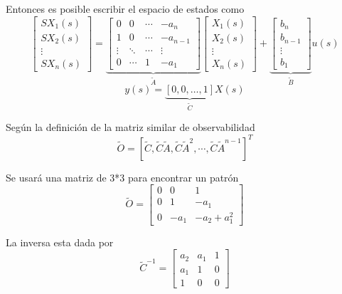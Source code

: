 Entonces es posible escribir el espacio de estados como
\[
    \begin{bmatrix}
        SX_{1}(s) \\
        SX_{2}(s) \\
        \vdots \\
        SX_{n}(s)
    \end{bmatrix}
    =
    \underbrace{
        \begin{bmatrix}
        0 & 0 & \cdots & -a_{n} \\
        1 & 0 & \cdots & -a_{n-1} \\
        \vdots & \ddots & \cdots & \vdots \\
        0 & \cdots & 1 & -a_{1}
        \end{bmatrix}
                }_{\tilde{A}}
    \begin{bmatrix}
        X_{1}(s) \\
        X_{2}(s) \\
        \vdots \\
        X_{n}(s)
    \end{bmatrix}
    +
    \underbrace{
        \begin{bmatrix}
        b_{n} \\
        b_{n-1} \\
        \vdots \\
        b_{1}
        \end{bmatrix}
                }_{\tilde{B}}
     u(s)
\]
\[
    y(s) = \underbrace{ [0,0,\ldots,1] }_{ \tilde{C} }X(s)
\]

Según la definición de la matriz similar de observabilidad
\[
    \tilde{O} = [
    \tilde{C},
    \tilde{C}\tilde{A},
    \tilde{C}\tilde{A}^{2},
    \cdots,
    \tilde{C}\tilde{A}^{n-1} ]^{T}
\]

Se usará una matriz de 3*3 para encontrar un patrón
\[
    \tilde{O} = 
    \begin{bmatrix}
        0 & 0 & 1 \\
        0 & 1 & -a_{1} \\
        0 & -a_{1} & -a_{2}+a_{1}^{2}
    \end{bmatrix}
\]

La inversa esta dada por
\[
    \tilde{C}^{-1} = 
    \begin{bmatrix}
        a_{2} & a_{1} & 1 \\
        a_{1} & 1 & 0 \\
        1 & 0 & 0
    \end{bmatrix}
\]

